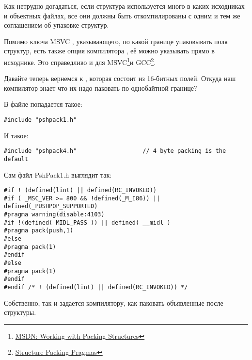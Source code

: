 Как нетрудно догадаться, если структура используется много в каких исходниках и объектных файлах, 
все они должны быть откомпилированы с одним и тем же соглашением об упаковке структур.

\newcommand{\FNURLMSDNZP}{\footnote{\href{http://go.yurichev.com/17067}
{MSDN: Working with Packing Structures}}}
\newcommand{\FNURLGCCPC}{\footnote{\href{http://go.yurichev.com/17068}
{Structure-Packing Pragmas}}}

Помимо ключа MSVC , указывающего, по какой границе упаковывать поля структур, есть также 
опция компилятора , её можно указывать прямо в исходнике. 
Это справедливо и для MSVC\FNURLMSDNZP и GCC\FNURLGCCPC{}.

Давайте теперь вернемся к , которая состоит из 16-битных полей. 
Откуда наш компилятор знает что их надо паковать по однобайтной границе?

В файле  попадается такое:

\begin{lstlisting}[caption=WinNT.h,style=customc]
#include "pshpack1.h"
\end{lstlisting}

И такое:

\begin{lstlisting}[caption=WinNT.h,style=customc]
#include "pshpack4.h"                   // 4 byte packing is the default
\end{lstlisting}

Сам файл PshPack1.h выглядит так:

\begin{lstlisting}[caption=PshPack1.h,style=customc]
#if ! (defined(lint) || defined(RC_INVOKED))
#if ( _MSC_VER >= 800 && !defined(_M_I86)) || defined(_PUSHPOP_SUPPORTED)
#pragma warning(disable:4103)
#if !(defined( MIDL_PASS )) || defined( __midl )
#pragma pack(push,1)
#else
#pragma pack(1)
#endif
#else
#pragma pack(1)
#endif
#endif /* ! (defined(lint) || defined(RC_INVOKED)) */
\end{lstlisting}

Собственно, так и задается компилятору, как паковать объявленные после  структуры.



